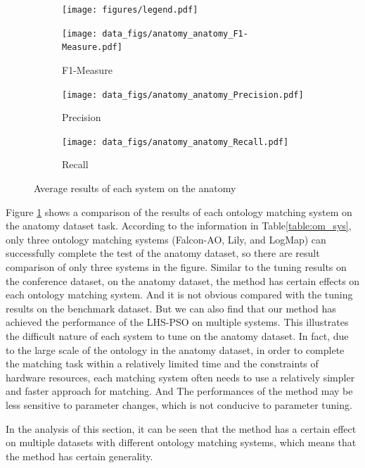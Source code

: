 \documentclass[twoside]{article}
\begin{document}
\begin{figure}[htb!]\centering
\begin{subfigure}{\textwidth}
	\centering
\texttt{[image: figures/legend.pdf]}
\end{subfigure}
\begin{subfigure}{0.3\textwidth}
	\centering
\texttt{[image: data\_figs/anatomy\_anatomy\_F1-Measure.pdf]}
\caption{F1-Measure}
\label{fig:anatomy_anatomy_F1-Measure}
\end{subfigure}
\begin{subfigure}{0.3\textwidth}
	\centering
\texttt{[image: data\_figs/anatomy\_anatomy\_Precision.pdf]}
\caption{Precision}
\label{fig:anatomy_anatomy_Precision}
\end{subfigure}
\begin{subfigure}{0.3\textwidth}
	\centering
\texttt{[image: data\_figs/anatomy\_anatomy\_Recall.pdf]}
\caption{Recall}
\label{fig:anatomy_anatomy_Recall}
\end{subfigure}
\caption{Average results of each system on the anatomy}
\end{figure}

Figure \ref{fig:anatomy_anatomy_F1-Measure} shows a comparison of the results of each ontology matching system on the anatomy dataset task.
According to the information in Table\ref{table:om_sys}, only three ontology matching systems (Falcon-AO, Lily, and LogMap) can successfully complete the test of the anatomy dataset, so there are result comparison of only three systems in the figure.
Similar to the tuning results on the conference dataset, on the anatomy dataset, the method has certain effects on each ontology matching system. And it is not obvious compared with the tuning results on the benchmark dataset.
But we can also find that our method has achieved the performance of the LHS-PSO on multiple systems.
This illustrates the difficult nature of each system to tune on the anatomy dataset.
In fact, due to the large scale of the ontology in the anatomy dataset, in order to complete the matching task within a relatively limited time and the constraints of hardware resources, each matching system often needs to use a relatively simpler and faster approach for matching. And The performances of the method may be less sensitive to parameter changes, which is not conducive to parameter tuning.

In the analysis of this section, it can be seen that the method has a certain effect on multiple datasets with different ontology matching systems, which means that the method has certain generality.
\end{document}
